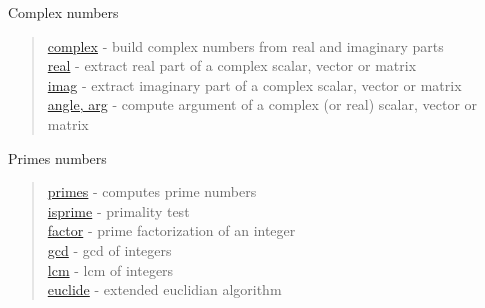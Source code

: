 Complex numbers

\begin{quote}
\noindent
\hyperlink{complex}{complex} - build complex numbers from real and imaginary parts\\
\hyperlink{real}{real} - extract real part of a complex scalar, vector or matrix\\
\hyperlink{imag}{imag} - extract imaginary part of a complex scalar, vector or matrix\\
\hyperlink{angle, arg}{angle, arg} - compute argument of a complex (or real) scalar, vector or matrix\\
\end{quote}

Primes numbers

\begin{quote}
\noindent
\hyperlink{primes}{primes} - computes prime numbers\\
\hyperlink{isprime}{isprime} - primality test\\
\hyperlink{factor}{factor} - prime factorization of an integer\\
\hyperlink{gcd}{gcd} - gcd of integers \\
\hyperlink{lcm}{lcm} - lcm of integers \\
\hyperlink{euclide}{euclide} - extended euclidian algorithm \\
\end{quote}















